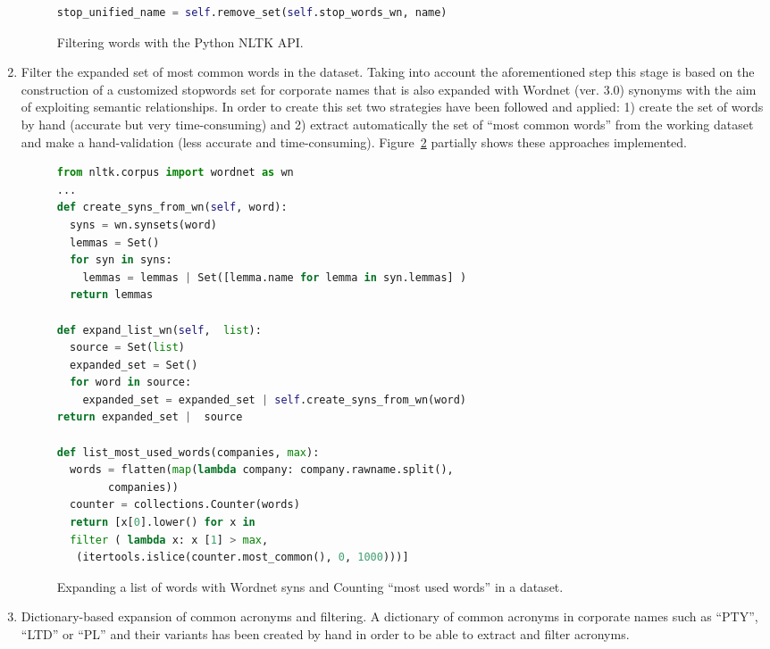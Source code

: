 \documentclass[1p,12pt]{elsarticle}
\begin{document}
\begin{enumerate}
\begin{figure}[!h]
\begin{center}
\begin{lstlisting}[language=Python]
stop_unified_name = self.remove_set(self.stop_words_wn, name)
\end{lstlisting}
\caption{Filtering words with the Python NLTK API.}
\label{figure:step-2}
\end{center}
\end{figure}

\item Filter the expanded set of most common words in the dataset. Taking into account 
the aforementioned step this stage is based on the construction of a customized stopwords 
set for corporate names that is also expanded with Wordnet (ver. 3.0) synonyms with the aim of 
exploiting semantic relationships. In order to create this set two strategies have been followed and applied: 1) create the set 
of words by hand (accurate but very time-consuming) and 2) extract automatically the set of ``most common words'' from the 
working dataset and make a hand-validation (less accurate and time-consuming). Figure~\ref{figure:step-3} partially 
shows these approaches implemented.
    
\begin{figure}[!h]
\begin{center}
\begin{lstlisting}[language=Python]  
from nltk.corpus import wordnet as wn
...
def create_syns_from_wn(self, word):
  syns = wn.synsets(word) 
  lemmas = Set()
  for syn in syns:
    lemmas = lemmas | Set([lemma.name for lemma in syn.lemmas] )
  return lemmas

def expand_list_wn(self,  list):    
  source = Set(list)
  expanded_set = Set()
  for word in source:
    expanded_set = expanded_set | self.create_syns_from_wn(word)
return expanded_set |  source

def list_most_used_words(companies, max):
  words = flatten(map(lambda company: company.rawname.split(), 
  		companies))
  counter = collections.Counter(words)  
  return [x[0].lower() for x in 
  filter ( lambda x: x [1] > max, 
   (itertools.islice(counter.most_common(), 0, 1000)))]
\end{lstlisting}
\caption{Expanding a list of words with Wordnet syns and Counting ``most used words'' in a dataset.}
\label{figure:step-3}
\end{center}
\end{figure}

\item Dictionary-based expansion of common acronyms and filtering. A dictionary of common acronyms in corporate 
names such as ``PTY'', ``LTD'' or ``PL'' and their variants has been created by hand in order 
to be able to extract and filter acronyms. 



\end{enumerate}
\end{document}
